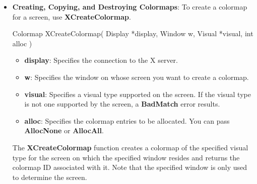 \documentclass{report}
\begin{document}
\begin{itemize}
            \bigbreak \noindent 
            Xcms functions in which gamut mapping can occur return \textbf{Status} and have specific status values defined for them, as follows:
            \begin{itemize}
                \item \textbf{XcmsFailure} indicates that the function failed.
                \item \textbf{XcmsSuccess} indicates that the function succeeded. In addition, if the function performed any color conversion, the colors did not need to be compressed.
                \item \textbf{XcmsSuccessWithCompression} indicates the function performed color conversion and at least one of the colors needed to be compressed. The gamut compression method is determined by the gamut compression procedure in the CCC that is specified directly as a function argument or in the CCC indirectly specified by means of the colormap argument.
            \end{itemize}
        \item \textbf{Creating, Copying, and Destroying Colormaps}: 
            \bigbreak \noindent
            To create a colormap for a screen, use \textbf{XCreateColormap}.
            \bigbreak \noindent
            \begin{cppcode}
                Colormap XCreateColormap(
                    Display *display,
                    Window w,
                    Visual *visual,
                    int alloc
                )
            \end{cppcode}
            \begin{itemize}
                \item \textbf{display}: Specifies the connection to the X server.
                \item \textbf{w}: Specifies the window on whose screen you want to create a colormap.
                \item \textbf{visual}: Specifies a visual type supported on the screen. If the visual type is not one supported by the screen, a \textbf{BadMatch} error results.
                \item \textbf{alloc}: Specifies the colormap entries to be allocated. You can pass \textbf{AllocNone} or \textbf{AllocAll}.
            \end{itemize}
            \bigbreak \noindent
            The \textbf{XCreateColormap} function creates a colormap of the specified visual type for the screen on which the specified window resides and returns the colormap ID associated with it. Note that the specified window is only used to determine the screen.

\end{itemize}
\end{document}
